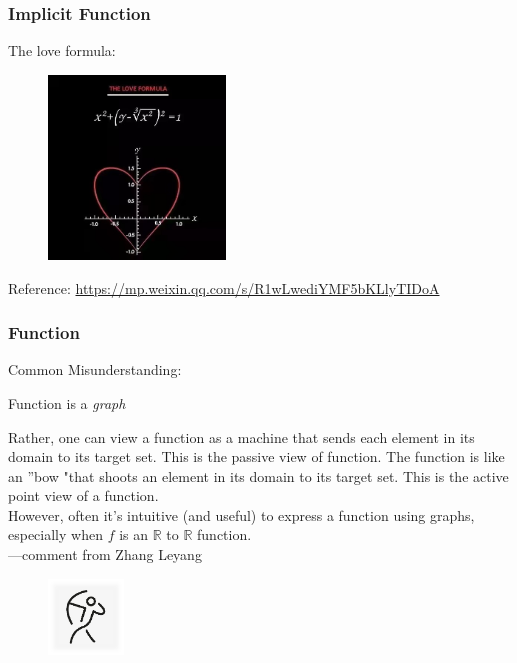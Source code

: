 \documentclass{beamer}
\begin{document}
\begin{frame}
    \frametitle{Implicit Function}
    The love formula:
    \begin{figure}
        \centering
        \includegraphics[width=0.42\textwidth]{implicit.jpg}
    \end{figure}
    Reference: \url{https://mp.weixin.qq.com/s/R1wLwediYMF5bKLlyTIDoA}
\end{frame}
\begin{frame}
    \frametitle{Function}
Common Misunderstanding:\\
\begin{center}
    Function is a \emph{graph}
\end{center}
\hspace{1em} Rather, one can view a function as a machine that sends each element in its domain to its target set. 
This is the passive view of function. The function is like an ''bow "that shoots an element in its domain to its 
target set. This is the active point view of a function.\\
\vspace{1em}
\hspace{1em} However, often it's intuitive (and useful) to express a function using graphs, especially when $f$ is an 
$\mathbb{R}$ to $\mathbb{R}$ function.\\
\hspace{15em}---comment from Zhang Leyang
\begin{figure}
    \includegraphics[width=0.18\textwidth]{bow.png}
\end{figure}
\end{frame}
\end{document}
